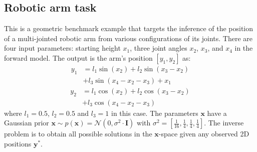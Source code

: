 \documentclass[letterpaper]{article} %
\begin{document}
\subsection{Robotic arm task}
This is a geometric benchmark example that targets the inference of the position of a multi-jointed robotic arm from various configurations of its joints. There are four input parameters: starting height $x_1$, three joint angles $x_2$, $x_3$, and $x_4$ in the forward model. The output is the arm's position $[y_1, y_2]$ as: 
\begin{equation}
\begin{aligned}
    y_1 &= l_1\sin(x_2) + l_2\sin(x_3-x_2) \\
    &+l_3\sin(x_4-x_2-x_3) + x_1  
\end{aligned}
\end{equation}
\begin{equation}
\begin{aligned}
    y_2 &= l_1\cos(x_2) + l_2\cos(x_3-x_2) \\
    &+ l_3\cos(x_4-x_2-x_3)
\end{aligned}
\end{equation}
where $l_1=0.5$, $l_2=0.5$ and $l_3=1$ in this case. The parameters $\mathbf{x}$ have a Gaussian prior $\mathbf{x} \sim p(\mathbf{x}) = \mathcal{N}(0, \sigma^2 \cdot \mathbf{I})$ with $\sigma^2 = [\frac{1}{16}, \frac{1}{4}, \frac{1}{4},\frac{1}{4}]$. The inverse problem is to obtain all possible solutions in the $\mathbf{x}$-space given any observed 2D positions $\mathbf{y}^*$. 
\end{document}
